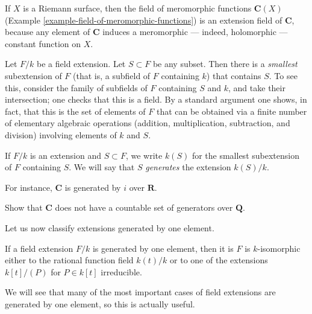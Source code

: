 \begin{example}
\label{example-field-of-meromorphic-functions-extension-C}
If $X$ is a Riemann surface, then the field of meromorphic functions
$\mathbf{C}(X)$ (Example \ref{example-field-of-meromorphic-functions})
is an extension field of $\mathbf{C}$, because any element of $\mathbf{C}$
induces a meromorphic --- indeed, holomorphic --- constant function on $X$.
\end{example}

\noindent
Let $F/k$ be a field extension. Let $S \subset F$ be any subset.
Then there is a {\it smallest} subextension of $F$ (that is, a subfield of
$F$ containing $k$) that contains $S$. To see this, consider the family of
subfields of $F $ containing $S$ and $k$, and take their intersection; one
checks that this is a field. By a standard argument one shows, in fact, that
this is the set of elements of $F$ that can be obtained via a finite number
of elementary algebraic operations (addition, multiplication, subtraction,
and division) involving elements of $k$ and $S$.

\begin{definition}
\label{definition-generated-by}
If $F/k$ is an extension and $S \subset F$, we write $k(S)$ for the smallest
subextension of $F$ containing $S$. We will say that $S$ {\it generates} the
extension $k(S)/k$.
\end{definition}

\noindent
For instance, $\mathbf{C}$ is generated by $i$ over $\mathbf{R}$.

\begin{exercise}
\label{exercise-C-not-countably-generated}
Show that $\mathbf{C}$ does not have a countable set of generators over
$\mathbf{Q}$.
\end{exercise}

\noindent
Let us now classify extensions generated by one element.

\begin{lemma}
\label{lemma-field-extension-generated-by-one-element}
If a field extension $F/k$ is generated by one element, then it is $F$ is
$k$-isomorphic either to the rational function field $k(t)/k$ or to one
of the extensions $k[t]/(P)$ for $P \in k[t]$ irreducible.
\end{lemma}

\noindent
We will see that many of the most important cases of field extensions are
generated by one element, so this is actually useful.

